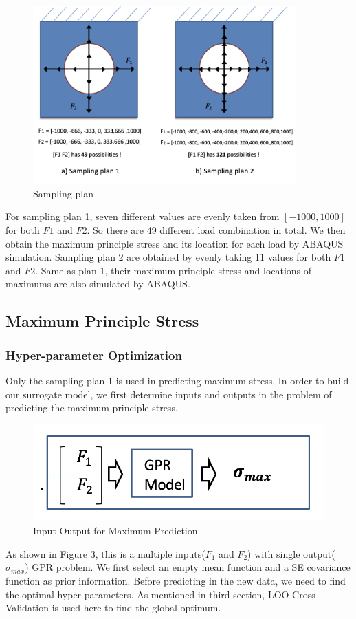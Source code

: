 \documentclass[conference]{IEEEtran}
\begin{document}
\begin{figure} 
\centering
\includegraphics[width=3.8 in,height=2.7in]{sampling1.png}
\caption{Sampling plan}
\label{fig:graph}
\end{figure}

For sampling plan 1, seven different values are evenly taken from $[-1000,1000]$ for both $F1$ and $F2$. So there are 49 different load combination in total. We then obtain the maximum principle stress and its location for each load by ABAQUS simulation. Sampling plan 2 are obtained by evenly taking 11 values for both $F1$ and $F2$. Same as plan 1, their maximum principle stress and locations of maximums are also simulated by ABAQUS.
\subsection{Maximum Principle Stress}
\subsubsection{Hyper-parameter Optimization} Only the sampling plan 1 is used in predicting maximum stress. In order to build our surrogate model, we first determine inputs and outputs in the problem of predicting the maximum principle stress.
\begin{figure} 
\centering
\includegraphics[width=2 in,height=0.8 in]{IO2-1.png}
\caption{Input-Output for Maximum Prediction}
\label{fig:graph}
\end{figure}
As shown in Figure 3, this is a multiple inputs($F_1$ and $F_2$) with single output($\sigma_{max}$) GPR problem. We first select an empty mean function and a SE covariance function as prior information. Before predicting in the new data, we need to find the optimal hyper-parameters. As mentioned in third section, LOO-Cross-Validation is used here to find the global optimum. 
\end{document}
